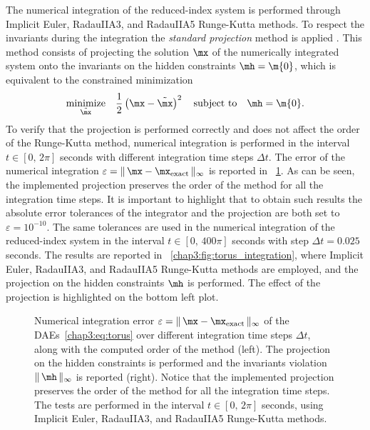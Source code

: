 The numerical integration of the reduced-index system is performed through Implicit Euler, RadauIIA3, and RadauIIA5 Runge-Kutta methods. To respect the invariants during the integration the \emph{standard projection} method is applied \cite{hairer2000symmetric}. This method consists of projecting the solution $\mx$ of the numerically integrated system onto the invariants on the hidden constraints $\mh = \m{0}$, which is equivalent to the constrained minimization
%
\begin{equation}
  \underset{\tilde{\mx}}{\textrm{minimize}} \quad \dfrac{1}{2}\left(\mx - \tilde{\mx}\right)^2
    \quad \textrm{subject to} \quad
    \mh = \m{0}.
\end{equation}
%
To verify that the projection is performed correctly and does not affect the order of the Runge-Kutta method, numerical integration is performed in the interval $t \in [0, \, 2\pi]$ seconds with different integration time steps $\Delta t$. The error of the numerical integration $\varepsilon = \| \, \mx - \mx_\text{exact} \, \|_{\infty}$ is reported in \figurename~\ref{chap3:fig:torus_order}. As can be seen, the implemented projection preserves the order of the method for all the integration time steps. It is important to highlight that to obtain such results the absolute error tolerances of the integrator and the projection are both set to $\varepsilon = 10^{-10}$. The same tolerances are used in the numerical integration of the reduced-index system in the interval $t \in [0, \, 400\pi]$ seconds with step $\Delta t = 0.025$ seconds. The results are reported in \figurename~\ref{chap3:fig:torus_integration}, where Implicit Euler, RadauIIA3, and RadauIIA5 Runge-Kutta methods are employed, and the projection on the hidden constraints $\mh$ is performed. The effect of the projection is highlighted on the bottom left plot.

\begin{figure}
  \centering
  \caption{Numerical integration error $\varepsilon = \| \, \mx - \mx_\text{exact} \, \|_{\infty}$ of the \acp{DAE}~\eqref{chap3:eq:torus} over different integration time steps $\Delta t$, along with the computed order of the method (left). The projection on the hidden constraints is performed and the invariants violation $\| \, \mh \, \|_{\infty}$ is reported (right). Notice that the implemented projection preserves the order of the method for all the integration time steps. The tests are performed in the interval $t \in [0, \, 2\pi]$ seconds, using Implicit Euler, RadauIIA3, and RadauIIA5 Runge-Kutta methods.}
  \label{chap3:fig:torus_order}
\end{figure}

